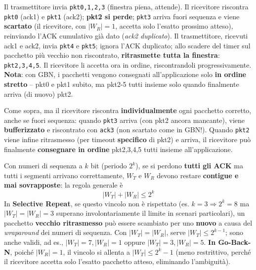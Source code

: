 \documentclass[12pt, a4paper]{article}
\begin{document}
\begin{tcolorbox}[colback=lightergray!10, colframe=tocsec, title={\textbf{Esempio -- Go-Back-N in azione} ($|W_T|=4$, $|W_R|=1$)}]
Il trasmettitore invia \texttt{pkt0,1,2,3} (finestra piena, attende). Il ricevitore riscontra \texttt{pkt0} (ack1) e \texttt{pkt1} (ack2); \textbf{pkt2 si perde}; \texttt{pkt3} arriva fuori sequenza e viene \textbf{scartato} (il ricevitore, con $|W_R|=1$, accetta solo l'esatto prossimo atteso), reinviando l'ACK cumulativo già dato (\textit{ack2 duplicato}). Il trasmettitore, ricevuti ack1 e ack2, invia \texttt{pkt4} e \texttt{pkt5}; ignora l'ACK duplicato; allo scadere del timer sul pacchetto più vecchio non riscontrato, \textbf{ritrasmette tutta la finestra}: \texttt{pkt2,3,4,5}. Il ricevitore li accetta ora in ordine, riscontrandoli progressivamente. \textbf{Nota}: con GBN, i pacchetti vengono consegnati all'applicazione solo \textbf{in ordine stretto} -- pkt0 e pkt1 subito, ma pkt2-5 tutti insieme solo quando finalmente arriva (di nuovo) pkt2.
\end{tcolorbox}

\begin{tcolorbox}[colback=lightergray!10, colframe=tocsec, title={\textbf{Esempio -- Selective Repeat in azione} ($|W_T|=|W_R|=4$)}]
Come sopra, ma il ricevitore riscontra \textbf{individualmente} ogni pacchetto corretto, anche se fuori sequenza: quando \texttt{pkt3} arriva (con pkt2 ancora mancante), viene \textbf{bufferizzato} e riscontrato con \texttt{ack3} (non scartato come in GBN!). Quando \texttt{pkt2} viene infine ritrasmesso (per timeout \textbf{specifico} di pkt2) e arriva, il ricevitore può finalmente \textbf{consegnare in ordine} pkt2,3,4,5 tutti insieme all'applicazione.
\end{tcolorbox}

\begin{tcolorbox}[colback=cyan!5, colframe=blue!40!black, title=\textbf{Vincolo tra dimensione delle finestre e spazio dei numeri di sequenza}]
Con numeri di sequenza a $k$ bit (periodo $2^k$), se si perdono \textbf{tutti gli ACK} ma tutti i segmenti arrivano correttamente, $W_T$ e $W_R$ devono restare \textbf{contigue e mai sovrapposte}: la regola generale è
$$|W_T| + |W_R| \leq 2^k$$
In \textbf{Selective Repeat}, se questo vincolo non è rispettato (es. $k=3\Rightarrow 2^k=8$ ma $|W_T|=|W_R|=3$ superano involontariamente il limite in scenari particolari), un pacchetto \textbf{vecchio ritrasmesso} può essere scambiato per uno \textbf{nuovo} a causa del \textit{wraparound} dei numeri di sequenza. Con $|W_T|=|W_R|$, serve $|W_T|\leq 2^{k-1}$; sono anche validi, ad es., $|W_T|=7,|W_R|=1$ oppure $|W_T|=3,|W_R|=5$. \textbf{In Go-Back-N}, poiché $|W_R|=1$, il vincolo si allenta a $|W_T|\leq 2^k-1$ (meno restrittivo, perché il ricevitore accetta solo l'esatto pacchetto atteso, eliminando l'ambiguità).
\end{tcolorbox}
\end{document}
